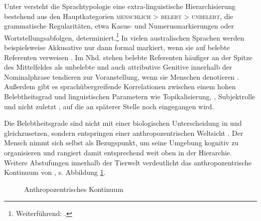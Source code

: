 Unter  versteht die Sprachtypologie eine extra-linguistische Hierarchisierung  bestehend aus den Hauptkategorien \textsc{menschlich > belebt > unbelebt}, die grammatische Regularitäten, etwa  Kasus- und Numerusmarkierungen  oder  Wortstellungsabfolgen, determiniert.\footnote{Weiterführend:  \cite{Silverstein1976,Allan1987,Comrie1989,Langacker1991,Dahl1996,Yamamoto1999,Yamamoto2006,Croft1995,Croft2006,Dixon1995, Corbett2000,Aissen2003,Zifonun2006, Dahl2008}.} In vielen australischen Sprachen werden beispielsweise Akkusative  nur dann formal markiert, wenn sie auf belebte  Referenten verweisen \parencite[189]{Comrie1989}. 
Im Nhd. stehen belebte  Referenten häufiger an der Spitze des Mittelfeldes  als unbelebte  \parencite{Kempen2004} und auch attributive Genitive  innerhalb der Nominalphrase  tendieren zur  Voranstellung, wenn sie Menschen denotieren  \parencite{Hartmann2003}. Außerdem gibt es sprachübergreifende Korrelationen zwischen einem hohen Belebtheitsgrad  und linguistischen Parametern wie Topikalisierung, , Subjektrolle  und nicht zuletzt  \parencite{Comrie1989, Yamamoto2006}, auf die an späterer Stelle noch eingegangen wird. 

Die Belebtheitsgrade  sind nicht mit einer biologischen Unterscheidung in  und  gleichzusetzen, sondern entspringen einer an\-thro\-po\-zen\-tri\-sch\-en Weltsicht \parencite[s.][]{Fraurud1996,Yamamoto1999,Enger2011}. Der Mensch nimmt sich selbst als Bezugspunkt, um seine Umgebung kognitiv zu organisieren und rangiert damit entsprechend weit oben in der  Hierarchie. Weitere Abstufungen innerhalb der Tierwelt verdeutlicht das anthropozentrische Kontinuum von \textcite[114--115]{Kopcke2000}, s. Abbildung \ref{anthro}. 

\begin{figure}
{\small{}}
\caption {Anthropozentrisches Kontinuum \parencite[115]{Kopcke2000}}
\label{anthro}
\end{figure} 

